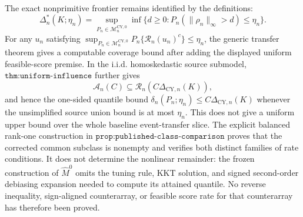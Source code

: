 The exact nonprimitive frontier remains identified by the definitions:
\[
 \Delta_n^*(K;\eta_n)
 =\sup_{P_n\in\mathcal M_n^{\mathrm{CY},0}}
 \inf\{d\ge0:P_n(\|\rho_n\|_\infty>d)\le\eta_n\}.
\]
For any \(u_n\) satisfying
\(\sup_{P_n\in\mathcal M_n^{\mathrm{CY},0}}
P_n\{\mathcal R_n(u_n)^c\}\le\eta_n\), the generic transfer theorem
gives a computable coverage bound after adding the displayed uniform
feasible-score premise.  In the i.i.d. homoskedastic source submodel,
\(\texttt{thm:uniform-influence}\) further gives
\[
 \mathcal A_n(C)\subseteq
 \mathcal R_n(C\Delta_{\mathrm{CY},n}(K)),
\]
and hence the one-sided quantile bound
\(\delta_n(P_n;\eta_n)\le C\Delta_{\mathrm{CY},n}(K)\) whenever the
unsimplified source union bound is at most \(\eta_n\).  This does not give
a uniform upper bound over the whole baseline event-transfer slice.
The explicit balanced rank-one construction in
\(\texttt{prop:published-class-comparison}\) proves that the corrected
common subclass is nonempty and verifies both distinct families of rate
conditions.  It does not determine the nonlinear remainder: the frozen
construction of \(\widehat M^0\) omits the tuning rule, KKT solution, and
signed second-order debiasing expansion needed to compute its attained
quantile.  No reverse inequality, sign-aligned counterarray, or feasible
score rate for that counterarray has therefore been proved.
